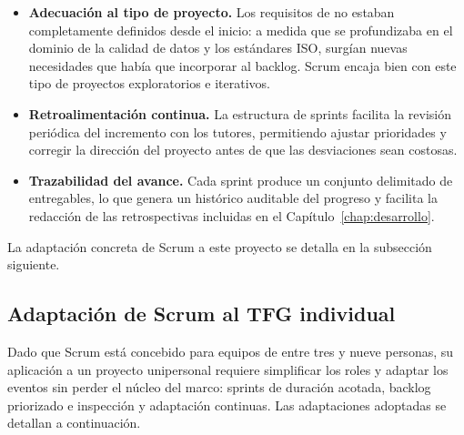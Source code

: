 \begin{itemize}
  \item \textbf{Adecuación al tipo de proyecto.}  Los requisitos de \dataqual
    no estaban completamente definidos desde el inicio: a medida que se
    profundizaba en el dominio de la calidad de datos y los estándares ISO,
    surgían nuevas necesidades que había que incorporar al backlog.  Scrum
    encaja bien con este tipo de proyectos exploratorios e iterativos.

  \item \textbf{Retroalimentación continua.}  La estructura de sprints
    facilita la revisión periódica del incremento con los tutores,
    permitiendo ajustar prioridades y corregir la dirección del proyecto
    antes de que las desviaciones sean costosas.

  \item \textbf{Trazabilidad del avance.}  Cada sprint produce un conjunto
    delimitado de entregables, lo que genera un histórico auditable del
    progreso y facilita la redacción de las retrospectivas incluidas en
    el Capítulo~\ref{chap:desarrollo}.
\end{itemize}

La adaptación concreta de Scrum a este proyecto se detalla en la
subsección siguiente.

\subsection{Adaptación de Scrum al TFG individual}

Dado que Scrum está concebido para equipos de entre tres y nueve personas,
su aplicación a un proyecto unipersonal requiere simplificar los roles y
adaptar los eventos sin perder el núcleo del marco: sprints de duración
acotada, backlog priorizado e inspección y adaptación continuas.  Las
adaptaciones adoptadas se detallan a continuación.

